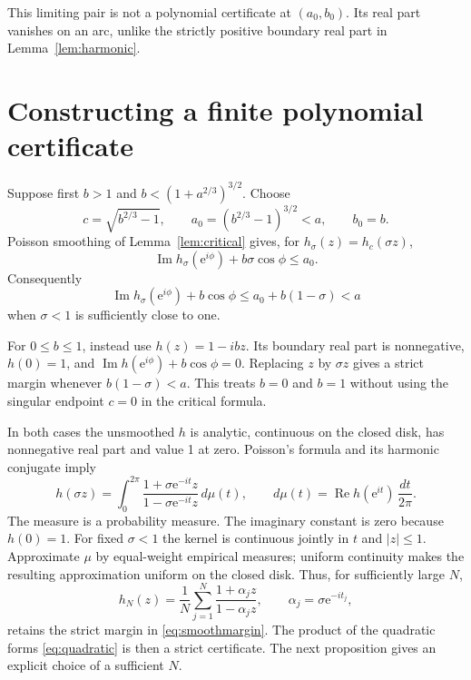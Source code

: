\documentclass[11pt]{article}
\theoremstyle{remark}\newtheorem{remark}[theorem]{Remark}
\newcommand{\Rea}{\operatorname{Re}}
\newcommand{\Ima}{\operatorname{Im}}
\newcommand{\ee}{\mathrm e}
\begin{document}
This limiting pair is not a polynomial certificate at
\((a_0,b_0)\). Its real part vanishes on an arc, unlike the
strictly positive boundary real part in Lemma~\ref{lem:harmonic}.

\section{Constructing a finite polynomial certificate}
Suppose first \(b>1\) and \(b<(1+a^{2/3})^{3/2}\).
Choose
\begin{equation}\label{eq:a0}
 c=\sqrt{b^{2/3}-1},\qquad
 a_0=(b^{2/3}-1)^{3/2}<a,\qquad b_0=b.
\end{equation}
Poisson smoothing of Lemma~\ref{lem:critical} gives, for
\(h_\sigma(z)=h_c(\sigma z)\),
\[
 \Ima h_\sigma(\ee^{i\phi})+b\sigma\cos\phi\le a_0.
\]
Consequently
\begin{equation}\label{eq:smoothmargin}
 \Ima h_\sigma(\ee^{i\phi})+b\cos\phi
       \le a_0+b(1-\sigma)<a
\end{equation}
when \(\sigma<1\) is sufficiently close to one.

For \(0\le b\le1\), instead use \(h(z)=1-ibz\).
Its boundary real part is nonnegative, \(h(0)=1\), and
\(\Ima h(\ee^{i\phi})+b\cos\phi=0\).
Replacing \(z\) by \(\sigma z\) gives a strict margin whenever
\(b(1-\sigma)<a\). This treats \(b=0\) and \(b=1\)
without using the singular endpoint \(c=0\) in the critical formula.

In both cases the unsmoothed \(h\) is analytic, continuous on the
closed disk, has nonnegative real part and value 1 at zero.
Poisson's formula and its harmonic conjugate imply
\begin{equation}\label{eq:herglotz}
 h(\sigma z)=\int_0^{2\pi}
       \frac{1+\sigma\ee^{-it}z}{1-\sigma\ee^{-it}z}\,d\mu(t),
 \qquad
 d\mu(t)=\Rea h(\ee^{it})\,\frac{dt}{2\pi}.
\end{equation}
The measure is a probability measure. The imaginary constant is
zero because \(h(0)=1\).
For fixed \(\sigma<1\) the kernel is continuous jointly in \(t\)
and \(|z|\le1\). Approximate \(\mu\) by equal-weight empirical
measures; uniform continuity makes the resulting approximation
uniform on the closed disk. Thus, for sufficiently large \(N\),
\[
 h_N(z)=\frac1N\sum_{j=1}^N
        \frac{1+\alpha_jz}{1-\alpha_jz},
 \qquad \alpha_j=\sigma\ee^{-it_j},
\]
retains the strict margin in \eqref{eq:smoothmargin}.
The product of the quadratic forms \eqref{eq:quadratic} is
then a strict certificate. The next proposition gives an explicit
choice of a sufficient \(N\).
\end{document}
